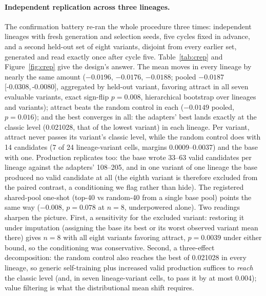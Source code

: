\documentclass[11pt]{article}
\newcommand{\ci}[2]{[#1,\,#2]}
\begin{document}
\paragraph{Independent replication across three lineages.} The
confirmation battery re-ran the whole procedure three times: independent
lineages with fresh generation and selection seeds, five cycles fixed in
advance, and a second held-out set of eight variants, disjoint from
every earlier set, generated and read exactly once after cycle five.
Table~\ref{tab:crep} and Figure~\ref{fig:crep} give the design's
answer. The mean moves in every lineage by nearly the same amount
($-0.0196$, $-0.0176$, $-0.0188$; pooled $-0.0187$
\ci{-0.0308}{-0.0080}, aggregated by held-out variant, favoring attract
in all seven evaluable variants, exact sign-flip $p=0.008$, hierarchical
bootstrap over lineages and variants); attract beats the random control
in each ($-0.0149$ pooled, $p=0.016$); and the best converges in all: the
adapters' best lands exactly at the classic level (0.021028, that of the
lowest variant) in each lineage. Per variant, attract never passes its
variant's classic level, while the random control does with 14
candidates (7 of 24 lineage-variant cells, margins 0.0009--0.0037) and
the base with one. Production replicates
too: the base wrote 33--63 valid candidates per lineage against the
adapters' 108--205, and in one variant of one lineage the base produced
no valid candidate at all (the eighth variant is therefore excluded from
the paired contrast, a conditioning we flag rather than hide). The
registered shared-pool one-shot (top-40 vs random-40 from a single base
pool) points the same way ($-0.008$, $p=0.078$ at $n{=}8$, underpowered
alone). Two readings sharpen the picture. First, a sensitivity for the
excluded variant: restoring it under imputation (assigning the base its
best or its worst observed variant mean there) gives $n{=}8$ with all
eight variants favoring attract, $p=0.0039$ under either bound, so the
conditioning was conservative. Second, a three-effect decomposition: the
random control also reaches the best of 0.021028 in every lineage, so
generic self-training plus increased valid production suffices to
\emph{reach} the classic level (and, in seven lineage-variant cells, to
pass it by at most 0.004); value filtering is what the distributional
mean shift requires.
\end{document}
